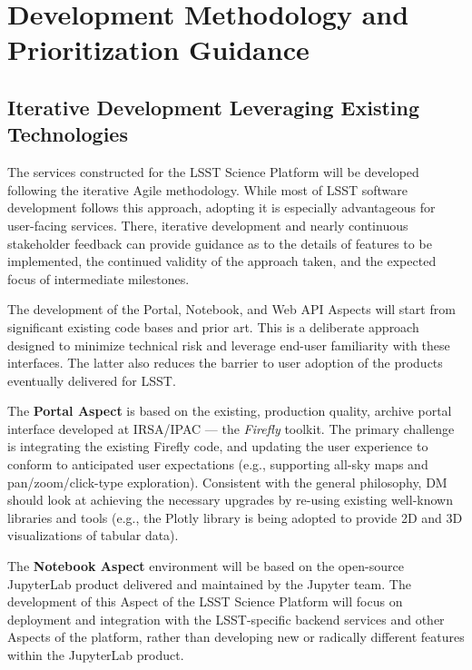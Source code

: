 \section{Development Methodology and Prioritization Guidance\label{sec:methdology}}

\subsection{Iterative Development Leveraging Existing Technologies }

The services constructed for the LSST Science Platform will be developed following the iterative Agile methodology. While most of LSST software development follows this approach, adopting it is especially advantageous for user-facing services. There, iterative development and nearly continuous stakeholder feedback can provide guidance as to the details of features to be implemented, the continued validity of the approach taken, and the expected focus of intermediate milestones.

The development of the Portal, Notebook, and Web API Aspects will start from significant existing code bases and prior art.
This is a deliberate approach designed to minimize technical risk and leverage end-user familiarity with these interfaces.
The latter also reduces the barrier to user adoption of the products eventually delivered for LSST.

The \textbf{Portal Aspect} is based on the existing, production quality, archive portal interface developed at IRSA/IPAC --- the \emph{Firefly} toolkit.
The primary challenge is integrating the existing Firefly code, and updating the user experience to conform to anticipated user expectations (e.g., supporting all-sky maps and pan/zoom/click-type exploration).
Consistent with the general philosophy, DM should look at achieving the necessary upgrades by re-using existing well-known libraries and tools (e.g., the Plotly library is being adopted to provide 2D and 3D visualizations of tabular data).

The \textbf{Notebook Aspect} environment will be based on the open-source JupyterLab product delivered and maintained by the Jupyter team.
The development of this Aspect of the LSST Science Platform will focus on deployment and integration with the LSST-specific backend services and other Aspects of the platform, rather than developing new or radically different features within the JupyterLab product.

